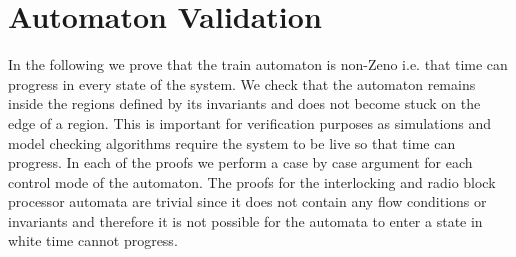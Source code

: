 \section{Automaton Validation}
In the following we prove that the train automaton is non-Zeno i.e. that time can progress in every state of the system. We check that the automaton remains inside the regions defined by its invariants and does not become stuck on the edge of a region. This is important for verification purposes as simulations and model checking algorithms require the system to be live so that time can progress. In each of the proofs we perform a case by case argument for each control mode of the automaton. The proofs for the interlocking and radio block processor  automata are trivial since it does not contain any flow conditions or invariants and therefore it is not possible for the automata to enter a state in white time cannot progress.
\medskip

